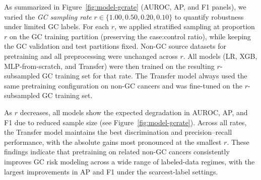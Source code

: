 \documentclass[diagnostics,article,submit,pdftex,moreauthors]{Definitions/mdpi}
\begin{document}
As summarized in Figure~\ref{fig:model-gcrate} (AUROC, AP, and F1 panels), we varied the \emph{GC sampling rate} $r \in \{1.00, 0.50, 0.20, 0.10\}$ to quantify robustness under limited GC labels.
For each $r$, we applied stratified sampling at proportion $r$ on the GC training partition (preserving the case{:}control ratio), while keeping the GC validation and test partitions fixed.
Non-GC source datasets for pretraining and all preprocessing were unchanged across $r$.
All models (LR, XGB, MLP-from-scratch, and Transfer) were then trained on the resulting $r$-subsampled GC training set for that rate.
The Transfer model always used the same pretraining configuration on non-GC cancers and was fine-tuned on the $r$-subsampled GC training set.

As $r$ decreases, all models show the expected degradation in AUROC, AP, and F1 due to reduced sample size (see Figure~\ref{fig:model-gcrate}).
Across all rates, the Transfer model maintains the best discrimination and precision--recall performance, with the absolute gains most pronounced at the smallest $r$.
These findings indicate that pretraining on related non-GC cancers consistently improves GC risk modeling across a wide range of labeled-data regimes, with the largest improvements in AP and F1 under the scarcest-label settings.

\end{document}
